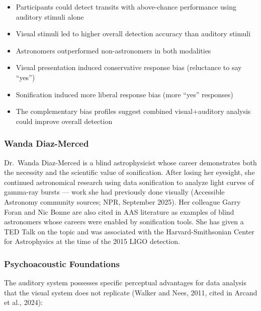 \documentclass[11pt,letterpaper]{article}
\begin{document}
\begin{itemize}
  \item Participants could detect transits with above-chance performance using auditory stimuli alone
  \item Visual stimuli led to higher overall detection accuracy than auditory stimuli
  \item Astronomers outperformed non-astronomers in both modalities
  \item Visual presentation induced conservative response bias (reluctance to say ``yes'')
  \item Sonification induced more liberal response bias (more ``yes'' responses)
  \item The complementary bias profiles suggest combined visual+auditory analysis could improve overall detection
\end{itemize}

\subsubsection{Wanda Diaz-Merced}

Dr.\ Wanda Diaz-Merced is a blind astrophysicist whose career demonstrates both the necessity and the scientific value of sonification. After losing her eyesight, she continued astronomical research using data sonification to analyze light curves of gamma-ray bursts — work she had previously done visually (Accessible Astronomy community sources; NPR, September 2025). Her colleague Garry Foran and Nic Bonne are also cited in AAS literature as examples of blind astronomers whose careers were enabled by sonification tools. She has given a TED Talk on the topic and was associated with the Harvard-Smithsonian Center for Astrophysics at the time of the 2015 LIGO detection.

\subsubsection{Psychoacoustic Foundations}

The auditory system possesses specific perceptual advantages for data analysis that the visual system does not replicate (Walker and Nees, 2011, cited in Arcand et al., 2024):
\end{document}
